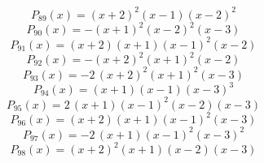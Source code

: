 \subitem \begin{dmath*}P_{89}(x) = {\left(x + 2\right)}^{2} {\left(x - 1\right)} {\left(x - 2\right)}^{2} \end{dmath*}\vspace{-1.2cm}
\subitem \begin{dmath*}P_{90}(x) = -{\left(x + 1\right)}^{2} {\left(x - 2\right)}^{2} {\left(x - 3\right)} \end{dmath*}\vspace{-1.2cm}
\subitem \begin{dmath*}P_{91}(x) = {\left(x + 2\right)} {\left(x + 1\right)} {\left(x - 1\right)}^{2} {\left(x - 2\right)} \end{dmath*}\vspace{-1.2cm}
\subitem \begin{dmath*}P_{92}(x) = -{\left(x + 2\right)}^{2} {\left(x + 1\right)}^{2} {\left(x - 2\right)} \end{dmath*}\vspace{-1.2cm}
\subitem \begin{dmath*}P_{93}(x) = -2 \, {\left(x + 2\right)}^{2} {\left(x + 1\right)}^{2} {\left(x - 3\right)} \end{dmath*}\vspace{-1.2cm}
\subitem \begin{dmath*}P_{94}(x) = {\left(x + 1\right)} {\left(x - 1\right)} {\left(x - 3\right)}^{3} \end{dmath*}\vspace{-1.2cm}
\subitem \begin{dmath*}P_{95}(x) = 2 \, {\left(x + 1\right)} {\left(x - 1\right)}^{2} {\left(x - 2\right)} {\left(x - 3\right)} \end{dmath*}\vspace{-1.2cm}
\subitem \begin{dmath*}P_{96}(x) = {\left(x + 2\right)} {\left(x + 1\right)} {\left(x - 1\right)}^{2} {\left(x - 3\right)} \end{dmath*}\vspace{-1.2cm}
\subitem \begin{dmath*}P_{97}(x) = -2 \, {\left(x + 1\right)} {\left(x - 1\right)}^{2} {\left(x - 3\right)}^{2} \end{dmath*}\vspace{-1.2cm}
\subitem \begin{dmath*}P_{98}(x) = {\left(x + 2\right)}^{2} {\left(x + 1\right)} {\left(x - 2\right)} {\left(x - 3\right)} \end{dmath*}\vspace{-1.2cm}
